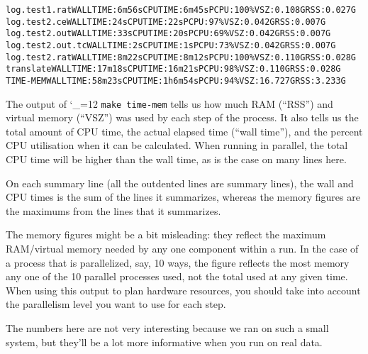 \documentclass[11pt,letterpaper]{article}
\def\code{\begingroup\catcode`\_=12 \codex}
\newcommand{\codex}[1]{\texttt{#1}\endgroup}
\begin{document}
\begin{tiny}
\begin{alltt}
      log.test1.rat                                       WALL TIME: 6m56s    CPU TIME: 6m45s     PCPU: 100\%   VSZ: 0.108G    RSS: 0.027G
      log.test2.ce                                        WALL TIME: 24s      CPU TIME: 22s       PCPU: 97\%    VSZ: 0.042G    RSS: 0.007G
      log.test2.out                                       WALL TIME: 33s      CPU TIME: 20s       PCPU: 69\%    VSZ: 0.042G    RSS: 0.007G
      log.test2.out.tc                                    WALL TIME: 2s       CPU TIME: 1s        PCPU: 73\%    VSZ: 0.042G    RSS: 0.007G
      log.test2.rat                                       WALL TIME: 8m22s    CPU TIME: 8m12s     PCPU: 100\%   VSZ: 0.110G    RSS: 0.028G
   translate                                              WALL TIME: 17m18s   CPU TIME: 16m21s    PCPU: 98\%    VSZ: 0.110G    RSS: 0.028G
TIME-MEM                                                  WALL TIME: 58m23s   CPU TIME: 1h6m54s   PCPU: 94\%    VSZ: 16.727G   RSS: 3.233G
\end{alltt}
\end{tiny}

The output of \code{make time-mem} tells us how much RAM (``RSS'') and
virtual memory (``VSZ'') was used by each step of the process. It also tells us
the total amount of CPU time, the actual elapsed time (``wall time''), and the
percent CPU utilisation when it can be calculated.  When
running in parallel, the total CPU time will be higher than the wall time, as is
the case on many lines here.

On each summary line (all the outdented lines are summary lines),
the wall and CPU times is the sum of the
lines it summarizes, whereas the memory figures are the maximums from
the lines that it summarizes.

The memory figures might be a bit misleading: they reflect the maximum
RAM/virtual memory needed by any one component within a run.  In the case of a
process that is parallelized, say, 10 ways, the figure reflects the most memory
any one of the 10 parallel processes used, not the total used at any given
time.  When using this output to plan hardware resources, you should take into
account the parallelism level you want to use for each step.

The numbers here are not very interesting because we ran on such a small
system, but they'll be a lot more informative when you run on real data.
\end{document}
